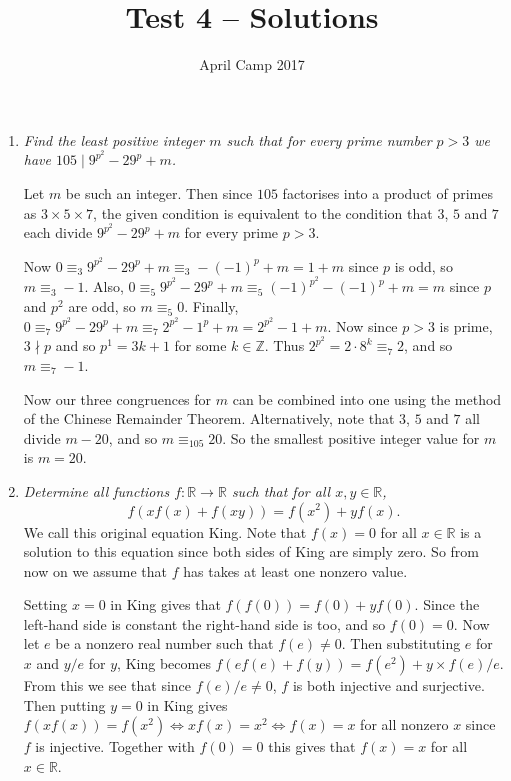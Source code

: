 \documentclass[a4paper,12pt]{article}
\author{April Camp 2017}
\title{Test 4 -- Solutions}
\date{}
\begin{document}
 \maketitle

\begin{enumerate}
	\item %
	\textit{Find the least positive integer $m$ such that for every prime number $p>3$ we have $105 \mid 9^{p^2} -29^p +m$.}
	
	Let $m$ be such an integer. Then since $105$ factorises into a product of primes as $3\times 5\times 7$, the given condition is equivalent to the condition that $3$, $5$ and $7$ each divide $9^{p^2} -29^p +m$ for every prime $p>3$.
	
	Now $0 \equiv_3 9^{p^2} -29^p +m \equiv_3 -(-1)^p+m = 1+m$ since $p$ is odd, so $m\equiv_3 -1$. Also, $0 \equiv_5 9^{p^2} -29^p +m \equiv_5 (-1)^{p^2} -(-1)^p +m = m$ since $p$ and $p^2$ are odd, so $m\equiv_5 0$. Finally, $0\equiv_7 9^{p^2} -29^p +m \equiv_7 2^{p^2} -1^p +m = 2^{p^2}-1+m$. Now since $p>3$ is prime, $3\nmid p$ and so $p^1 = 3k+1$ for some $k\in\mathbb{Z}$. Thus $2^{p^2} = 2\cdot 8^k \equiv_7 2$, and so $m\equiv_7 -1$.
	
	Now our three congruences for $m$ can be combined into one using the method of the Chinese Remainder Theorem. Alternatively, note that $3$, $5$ and $7$ all divide $m-20$, and so $m\equiv_{105} 20$. So the smallest positive integer value for $m$ is $m=20$.
	
	\item
	\textit{Determine all functions $f: \mathbb{R}\to\mathbb{R}$ such that for all $x,y\in\mathbb{R}$, $$f(xf(x)+f(xy)) = f(x^2) +yf(x).$$}
	We call this original equation King. Note that $f(x)=0$ for all $x\in\mathbb{R}$ is a solution to this equation since both sides of King are simply zero. So from now on we assume that $f$ has takes at least one nonzero value.
	
	Setting $x=0$ in King gives that $f(f(0)) = f(0)+yf(0)$. Since the left-hand side is constant the right-hand side is too, and so $f(0)=0$. Now let $e$ be a nonzero real number such that $f(e)\neq0$. Then substituting $e$ for $x$ and $y/e$ for $y$, King becomes $f(ef(e)+f(y)) = f(e^2)+y\times f(e)/e$. From this we see that since $f(e)/e\neq0$, $f$ is both injective and surjective. Then putting $y=0$ in King gives $f(xf(x)) = f(x^2) \iff xf(x)=x^2 \iff f(x)=x$ for all nonzero $x$ since $f$ is injective. Together with $f(0)=0$ this gives that $f(x)=x$ for all $x\in\mathbb{R}$.
	

\end{enumerate}
\end{document}
